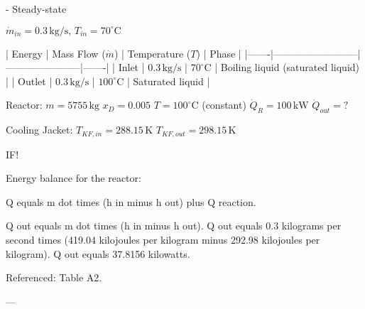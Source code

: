 - Steady-state  

\( \dot{m}_{in} = 0.3 \, \text{kg/s}, \, T_{in} = 70^\circ \text{C} \)  

| Energy | Mass Flow (\( \dot{m} \)) | Temperature (\( T \)) | Phase |  
|-------|--------------------------|-----------------------|-------|  
| Inlet | \( 0.3 \, \text{kg/s} \) | \( 70^\circ \text{C} \) | Boiling liquid (saturated liquid) |  
| Outlet | \( 0.3 \, \text{kg/s} \) | \( 100^\circ \text{C} \) | Saturated liquid |  

Reactor:  
\( m = 5755 \, \text{kg} \)  
\( x_D = 0.005 \)  
\( T = 100^\circ \text{C} \) (constant)  
\( \dot{Q}_R = 100 \, \text{kW} \)  
\( \dot{Q}_{out} = ? \)  

Cooling Jacket:  
\( T_{KF,in} = 288.15 \, \text{K} \)  
\( T_{KF,out} = 298.15 \, \text{K} \)  

IF!

Energy balance for the reactor:  

Q equals m dot times (h in minus h out) plus Q reaction.  

Q out equals m dot times (h in minus h out).  
Q out equals 0.3 kilograms per second times (419.04 kilojoules per kilogram minus 292.98 kilojoules per kilogram).  
Q out equals 37.8156 kilowatts.  

Referenced: Table A2.  

---